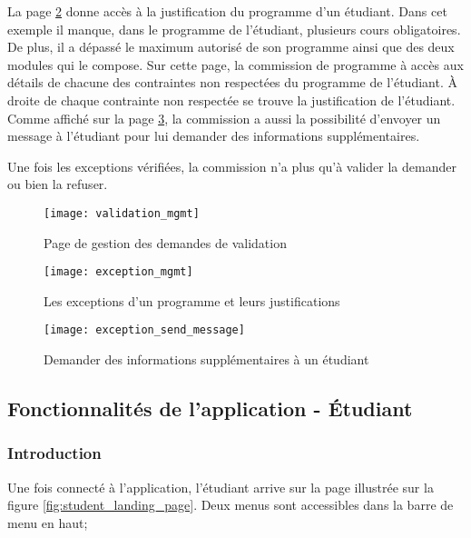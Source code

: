 La page \ref{fig:exception_mgmt} donne accès à la justification du programme d'un étudiant. Dans cet exemple il manque, dans le programme de l'étudiant, plusieurs cours obligatoires. De plus, il a dépassé le maximum autorisé de son programme ainsi que des deux modules qui le compose. Sur cette page, la commission de programme à accès aux détails de chacune des contraintes non respectées du programme de l'étudiant. À droite de chaque contrainte non respectée se trouve la justification de l'étudiant. Comme affiché sur la page \ref{fig:exception_send_message}, la commission a aussi la possibilité d'envoyer un message à l'étudiant pour lui demander des informations supplémentaires. 

Une fois les exceptions vérifiées, la commission n'a plus qu'à valider la demander ou bien la refuser. 




\begin{figure}
\centering
\caption{Page de gestion des demandes de validation}
\label{fig:validation_mgmt}
\texttt{[image: validation\_mgmt]}
\end{figure}

\begin{figure}[!htb]
\centering
\caption{Les exceptions d'un programme et leurs justifications}
\label{fig:exception_mgmt}
\texttt{[image: exception\_mgmt]}
\end{figure}

\begin{figure}
\centering
\caption{Demander des informations supplémentaires à un étudiant}
\label{fig:exception_send_message}
\texttt{[image: exception\_send\_message]}
\end{figure}

\clearpage
\subsection{Fonctionnalités de l'application - Étudiant}
\subsubsection{Introduction}
Une fois connecté à l'application, l'étudiant arrive sur la page illustrée sur la figure \ref{fig:student_landing_page}. Deux menus sont accessibles dans la barre de menu en haut; 

